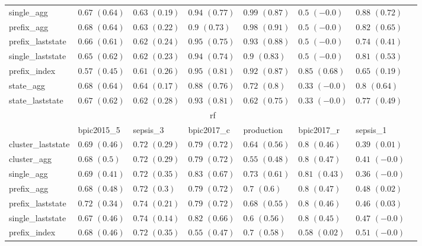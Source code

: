 \documentclass[twoside,11pt]{Latex/Classes/PhDthesisPSnPDF}
\begin{document}
\begin{table}[h]
{\begin{tabular}{llllllll}
		single\_agg & $0.67$ ${(0.64)}$ & $0.63$ ${(0.19)}$ & $0.94$ ${(0.77)}$ & $0.99$ ${(0.87)}$ & $0.5$ ${(-0.0)}$ & $\mathbf{0.88}$ $\mathbf{(0.72)}$  \\
		prefix\_agg & $0.68$ ${(0.64)}$ & $0.63$ ${(0.22)}$ & $0.9$ ${(0.73)}$ & $0.98$ ${(0.91)}$ & $0.5$ ${(-0.0)}$ & $0.82$ ${(0.65)}$ \\
		prefix\_laststate & $0.66$ ${(0.61)}$ & $0.62$ ${(0.24)}$ & $0.95$ ${(0.75)}$ & $0.93$ ${(0.88)}$ & $0.5$ ${(-0.0)}$ & $0.74$ ${(0.41)}$ \\
		single\_laststate & $0.65$ ${(0.62)}$ & $0.62$ ${(0.23)}$ & $0.94$ ${(0.74)}$ & $0.9$ ${(0.83)}$ & $0.5$ ${(-0.0)}$ & $0.81$ ${(0.53)}$ \\
		prefix\_index & $0.57$ ${(0.45)}$ & $0.61$ ${(0.26)}$ & $0.95$ ${(0.81)}$ & $0.92$ ${(0.87)}$ & $0.85$ ${(0.68)}$ & $0.65$ ${(0.19)}$ \\
		state\_agg & $0.68$ ${(0.64)}$ & $0.64$ ${(0.17)}$ & $0.88$ ${(0.76)}$ & $0.72$ ${(0.8)}$ & $0.33$ ${(-0.0)}$ & $0.8$ ${(0.64)}$ \\
		state\_laststate & $0.67$ ${(0.62)}$ & $0.62$ ${(0.28)}$ & $0.93$ ${(0.81)}$ & $0.62$ ${(0.75)}$ & $0.33$ ${(-0.0)}$ & $0.77$ ${(0.49)}$ \\
		\bottomrule
		\toprule
		& \multicolumn{5}{c}{rf}
		\\
		& bpic2015\_5 & sepsis\_3 & bpic2017\_c & production & bpic2017\_r & sepsis\_1
		\\ \midrule
		cluster\_laststate & $0.69$ ${(0.46)}$ & $0.72$ ${(0.29)}$ & $0.79$ ${(0.72)}$ & $0.64$ ${(0.56)}$ & $0.8$ ${(0.46)}$ & $0.39$ ${(0.01)}$ \\
		cluster\_agg & $0.68$ ${(0.5)}$ & $0.72$ ${(0.29)}$ & $0.79$ ${(0.72)}$ & $0.55$ ${(0.48)}$ & $0.8$ ${(0.47)}$ & $0.41$ ${(-0.0)}$ \\
		single\_agg & $0.69$ ${(0.41)}$ & $0.72$ ${(0.35)}$ & $0.83$ ${(0.67)}$ & $\mathbf{0.73}$ $\mathbf{(0.61)}$  & $0.81$ ${(0.43)}$ & $0.36$ ${(-0.0)}$ \\
		prefix\_agg & $0.68$ ${(0.48)}$ & $0.72$ ${(0.3)}$ & $0.79$ ${(0.72)}$ & $0.7$ ${(0.6)}$ & $0.8$ ${(0.47)}$ & $0.48$ ${(0.02)}$ \\
		prefix\_laststate & $0.72$ ${(0.34)}$ & $0.74$ ${(0.21)}$ & $0.79$ ${(0.72)}$ & $0.68$ ${(0.55)}$ & $0.8$ ${(0.46)}$ & $0.46$ ${(0.03)}$ \\
		single\_laststate & $0.67$ ${(0.46)}$ & $0.74$ ${(0.14)}$ & $0.82$ ${(0.66)}$ & $0.6$ ${(0.56)}$ & $0.8$ ${(0.45)}$ & $0.47$ ${(-0.0)}$ \\
		prefix\_index & $0.68$ ${(0.46)}$ & $0.72$ ${(0.35)}$ & $0.55$ ${(0.47)}$ & $0.7$ ${(0.58)}$ & $0.58$ ${(0.02)}$ & $0.51$ ${(-0.0)}$ \\

\end{tabular}}
\end{table}
\end{document}
